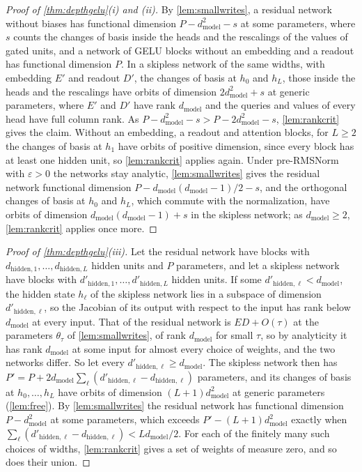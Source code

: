 \documentclass[10pt]{article}
\theoremstyle{definition}
\theoremstyle{remark}
\newcommand{\dm}{d_{\mathrm{model}}}
\begin{document}
\begin{proof}[Proof of \cref{thm:depthgelu}(i) and (ii)]
By \cref{lem:smallwrites}, a residual network without biases has functional dimension $P - \dm^2 - s$ at some parameters, where $s$ counts the changes of basis inside the heads and the rescalings of the values of gated units, and a network of GELU blocks without an embedding and a readout has functional dimension $P$. In a skipless network of the same widths, with embedding $E'$ and readout $D'$, the changes of basis at $h_0$ and $h_L$, those inside the heads and the rescalings have orbits of dimension $2\dm^2 + s$ at generic parameters, where $E'$ and $D'$ have rank $\dm$ and the queries and values of every head have full column rank. As $P - \dm^2 - s > P - 2\dm^2 - s$, \cref{lem:rankcrit} gives the claim. Without an embedding, a readout and attention blocks, for $L \ge 2$ the changes of basis at $h_1$ have orbits of positive dimension, since every block has at least one hidden unit, so \cref{lem:rankcrit} applies again. Under pre-RMSNorm with $\varepsilon > 0$ the networks stay analytic, \cref{lem:smallwrites} gives the residual network functional dimension $P - \dm(\dm-1)/2 - s$, and the orthogonal changes of basis at $h_0$ and $h_L$, which commute with the normalization, have orbits of dimension $\dm(\dm-1) + s$ in the skipless network; as $\dm \ge 2$, \cref{lem:rankcrit} applies once more.
\end{proof}


\begin{proof}[Proof of \cref{thm:depthgelu}(iii)]
Let the residual network have blocks with $d_{\mathrm{hidden},1}, \dots, d_{\mathrm{hidden},L}$ hidden units and $P$ parameters, and let a skipless network have blocks with $d'_{\mathrm{hidden},1}, \dots, d'_{\mathrm{hidden},L}$ hidden units. If some $d'_{\mathrm{hidden},\ell} < \dm$, the hidden state $h_\ell$ of the skipless network lies in a subspace of dimension $d'_{\mathrm{hidden},\ell}$, so the Jacobian of its output with respect to the input has rank below $\dm$ at every input. That of the residual network is $ED + O(\tau)$ at the parameters $\theta_\tau$ of \cref{lem:smallwrites}, of rank $\dm$ for small $\tau$, so by analyticity it has rank $\dm$ at some input for almost every choice of weights, and the two networks differ. So let every $d'_{\mathrm{hidden},\ell} \ge \dm$. The skipless network then has $P' = P + 2\dm\sum_\ell(d'_{\mathrm{hidden},\ell} - d_{\mathrm{hidden},\ell})$ parameters, and its changes of basis at $h_0, \dots, h_L$ have orbits of dimension $(L+1)\dm^2$ at generic parameters (\cref{lem:free}). By \cref{lem:smallwrites} the residual network has functional dimension $P - \dm^2$ at some parameters, which exceeds $P' - (L+1)\dm^2$ exactly when $\sum_\ell(d'_{\mathrm{hidden},\ell} - d_{\mathrm{hidden},\ell}) < L\dm/2$. For each of the finitely many such choices of widths, \cref{lem:rankcrit} gives a set of weights of measure zero, and so does their union.
\end{proof}
\end{document}
